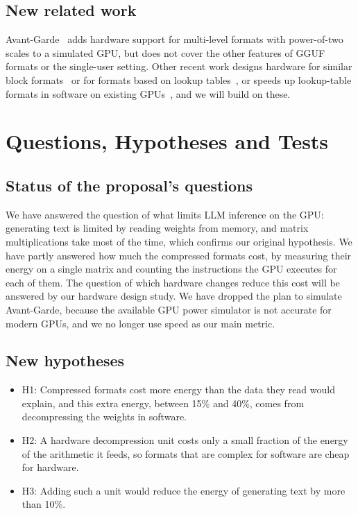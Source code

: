 \documentclass[10pt,twocolumn,letterpaper]{article}
\begin{document}
\subsection{New related work}
Avant-Garde~\cite{ag} adds hardware support for multi-level formats with power-of-two scales to a simulated GPU,
but does not cover the other features of GGUF formats or the single-user setting. Other recent work designs hardware for similar block
formats~\cite{mxnpu} or for formats based on lookup tables~\cite{lut}, or speeds up lookup-table formats in
software on existing GPUs~\cite{flute}, and we will build on these.

\section{Questions, Hypotheses and Tests}

\subsection{Status of the proposal's questions}
We have answered the question of what limits LLM inference on the GPU: generating text is limited by reading weights
from memory, and matrix multiplications take most of the time, which confirms our original hypothesis. We have
partly answered how much the compressed formats cost, by measuring their energy on a single matrix and counting
the instructions the GPU executes for each of them. The question of
which hardware changes reduce this cost will be answered by our hardware design study. We have dropped the plan to
simulate Avant-Garde, because the available GPU power simulator is not accurate for modern GPUs, and we no longer
use speed as our main metric.

\subsection{New hypotheses}
\begin{itemize}
\item H1: Compressed formats cost more energy than the data they read would explain, and this extra energy, between
15\% and 40\%, comes from decompressing the weights in software.
\item H2: A hardware decompression unit costs only a small fraction of the energy of the arithmetic it feeds, so
formats that are complex for software are cheap for hardware.
\item H3: Adding such a unit would reduce the energy of generating text by more than 10\%.
\end{itemize}
\end{document}

